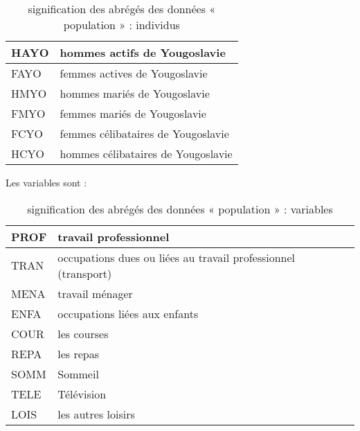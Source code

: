 \begin{table}[ht]
\begin{tabular}{|l|l|}
HAYO  & hommes actifs de Yougoslavie            \\ \hline
FAYO  & femmes actives de Yougoslavie           \\ \hline
HMYO  & hommes mariés de Yougoslavie            \\ \hline
FMYO  & femmes mariés de Yougoslavie            \\ \hline
FCYO  & femmes célibataires de Yougoslavie      \\ \hline
HCYO  & hommes célibataires de Yougoslavie      \\ \hline
\end{tabular}
\caption{signification des abrégés des données « population » : individus}
\label{tab:my-table}
\end{table}

Les variables sont :

\begin{table}[ht]
\centering
\begin{tabular}{|l|l|}
\hline
PROF & travail professionnel                                          \\ \hline
TRAN & occupations dues ou liées au travail professionnel (transport) \\ \hline
MENA & travail ménager                                                \\ \hline
ENFA & occupations liées aux enfants                                  \\ \hline
COUR & les courses                                                    \\ \hline
REPA & les repas                                                      \\ \hline
SOMM & Sommeil                                                        \\ \hline
TELE & Télévision                                                     \\ \hline
LOIS & les autres loisirs                                             \\ \hline
\end{tabular}
\caption{signification des abrégés des données « population » : variables}
\label{tab:my-table2}
\end{table}